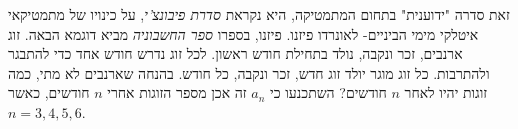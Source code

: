 \documentclass{article}
\begin{document}
זאת סדרה "ידוענית" בתחום המתמטיקה, היא נקראת 
{\it סדרת פיבונצ'י}, 
על כינויו של מתמטיקאי איטלקי מימי הביניים- לאונרדו פיזנו. 
פיזנו, בספרו 
{\it ספר החשבוניה} 
מביא דוגמא הבאה. 
זוג ארנבים, זכר ונקבה, נולד בתחילת חודש ראשון. 
לכל זוג נדרש חודש אחד כדי להתבגר ולהתרבות. 
כל זוג מוגר יולד זוג חדש, זכר ונקבה, כל חודש. 
בהנחה שארנבים לא מתי, כמה זוגות יהיו לאחר 
$n$
חודשים? 
השתכנעו כי 
$a_n$ 
זה אכן מספר הזוגות אחרי 
$n$ 
חודשים, 
כאשר 
$n=3,4,5,6$. 
\end{document}
